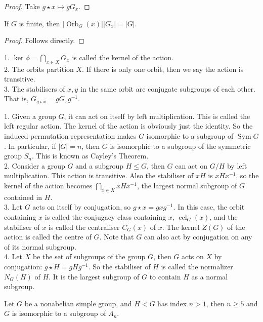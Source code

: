 \begin{proof}
    Take $g\star x\mapsto gG_x$.
\end{proof}
\begin{corollary}
    If $G$ is finite, then $|\operatorname{Orb}_G(x)||G_x|=|G|$.
\end{corollary}
\begin{proof}
    Follows directly.
\end{proof}
\begin{remark}
    1. $\ker\phi=\bigcap_{x\in X}G_x$ is called the kernel of the action.\\
    2. The orbits partition $X$.
    If there is only one orbit, then we say the action is transitive.\\
    3. The stabilisers of $x,y$ in the same orbit are conjugate subgroups of each other.
    That is, $G_{g\star x}=gG_xg^{-1}$.
\end{remark}
\begin{example}
    1. Given a group $G$, it can act on itself by left multiplication.
    This is called the left regular action.
    The kernel of the action is obviously just the identity.
    So the induced permutation representation makes $G$ isomorphic to a subgroup of $\operatorname{Sym}G$.
    In particular, if $|G|=n$, then $G$ is isomorphic to a subgroup of the symmetric group $S_n$.
    This is known as Cayley's Theorem.\\
    2. Consider a group $G$ and a subgroup $H\le G$, then $G$ can act on $G/H$ by left multiplication.
    This action is transitive.
    Also the stabiliser of $xH$ is $xHx^{-1}$, so the kernel of the action becomes $\bigcap_{x\in X}xHx^{-1}$, the largest normal subgroup of $G$ contained in $H$.\\
    3. Let $G$ acts on itself by conjugation, so $g\star x=gxg^{-1}$.
    In this case, the orbit containing $x$ is called the conjugacy class containing $x$, $\operatorname{ccl}_G(x)$, and the stabiliser of $x$ is called the centraliser $C_G(x)$ of $x$.
    The kernel $Z(G)$ of the action is called the centre of $G$.
    Note that $G$ can also act by conjugation on any of its normal subgroup.\\
    4. Let $X$ be the set of subgroups of the group $G$, then $G$ acts on $X$ by conjugation: $g\star H=gHg^{-1}$.
    So the stabiliser of $H$ is called the normalizer $N_G(H)$ of $H$.
    It is the largest subgroup of $G$ to contain $H$ as a normal subgroup.
\end{example}
\begin{theorem}
    Let $G$ be a nonabelian simple group, and $H<G$ has index $n>1$, then $n\ge 5$ and $G$ is isomorphic to a subgroup of $A_n$.
\end{theorem}
